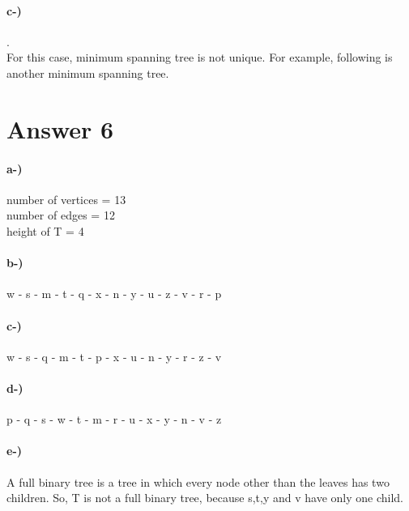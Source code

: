 \documentclass[12pt]{article}
\begin{document}
\paragraph{c-)}.\\
For this case, minimum spanning tree is not unique. For example, following is another minimum spanning tree.
\begin{figure}[H]
	\centering
\end{figure}
\section*{Answer 6}
\paragraph{a-)}
number of vertices = 13 \\
number of edges = 12 \\
height of T = 4 
\paragraph{b-)}
w - s - m - t - q - x - n - y - u -  z - v - r - p
\paragraph{c-)}
w - s - q - m - t - p - x - u - n - y - r - z - v 
\paragraph{d-)}
p - q - s - w - t - m - r - u - x - y - n - v - z
\paragraph{e-)}
A full binary tree is a tree in which every node other than the leaves has two children. So, T is not a full binary tree, because s,t,y and v have only one child.
\end{document}
